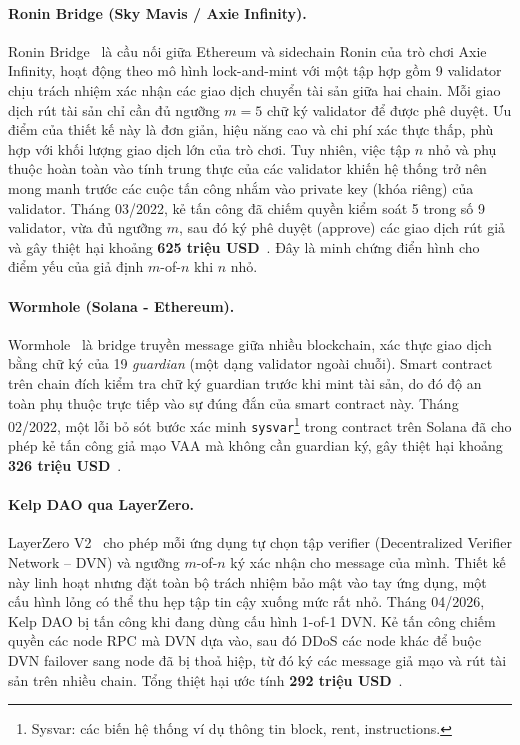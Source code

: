 \paragraph{Ronin Bridge (Sky Mavis / Axie Infinity).}
Ronin Bridge~\cite{ronin_bridge_docs} là cầu nối giữa Ethereum và sidechain Ronin của trò chơi Axie Infinity,
hoạt động theo mô hình lock-and-mint với một tập hợp gồm 9 validator chịu trách nhiệm
xác nhận các giao dịch chuyển tài sản giữa hai chain.
Mỗi giao dịch rút tài sản chỉ cần đủ ngưỡng $m = 5$ chữ ký validator để được phê duyệt.
Ưu điểm của thiết kế này là đơn giản, hiệu năng cao và chi phí xác thực thấp,
phù hợp với khối lượng giao dịch lớn của trò chơi.
Tuy nhiên, việc tập $n$ nhỏ và phụ thuộc hoàn toàn vào tính trung thực của các validator
khiến hệ thống trở nên mong manh trước các cuộc tấn công nhắm vào private key (khóa riêng) của validator.
Tháng 03/2022, kẻ tấn công đã chiếm quyền kiểm soát 5 trong số 9 validator,
vừa đủ ngưỡng $m$, sau đó ký phê duyệt (approve) các giao dịch rút giả và gây thiệt hại
khoảng \textbf{625 triệu USD}~\cite{ronin_postmortem}. Đây là minh chứng điển hình cho điểm yếu của giả định
$m$-of-$n$ khi $n$ nhỏ.

\paragraph{Wormhole (Solana - Ethereum).}
Wormhole~\cite{wormhole_docs} là bridge truyền message giữa nhiều blockchain,
xác thực giao dịch bằng chữ ký của 19 \textit{guardian} (một dạng validator
ngoài chuỗi). Smart contract trên chain đích kiểm tra chữ ký guardian trước khi
mint tài sản, do đó độ an toàn phụ thuộc trực tiếp vào sự đúng đắn của smart
contract này.
Tháng 02/2022, một lỗi bỏ sót bước xác minh 
\texttt{sysvar}\footnote{Sysvar: các biến hệ thống ví dụ thông tin block, rent, instructions.} trong contract trên
Solana đã cho phép kẻ tấn công giả mạo VAA mà không cần guardian ký, gây thiệt
hại khoảng \textbf{326 triệu USD}~\cite{wormhole_chainalysis}.

\paragraph{Kelp DAO qua LayerZero.}
LayerZero V2~\cite{layerzero_v2_docs} cho phép mỗi ứng dụng tự chọn tập
verifier (Decentralized Verifier Network -- DVN) và ngưỡng $m$-of-$n$ ký xác
nhận cho message của mình. Thiết kế này linh hoạt nhưng đặt toàn bộ trách nhiệm
bảo mật vào tay ứng dụng, một cấu hình lỏng có thể thu hẹp tập tin cậy xuống
mức rất nhỏ.
Tháng 04/2026, Kelp DAO bị tấn công khi đang dùng cấu hình 1-of-1 DVN. Kẻ tấn
công chiếm quyền các node RPC mà DVN dựa vào, sau đó DDoS các node khác để
buộc DVN failover sang node đã bị thoả hiệp, từ đó ký các message giả mạo và
rút tài sản trên nhiều chain. Tổng thiệt hại ước tính
\textbf{292 triệu USD}~\cite{kelp_chainalysis}.

